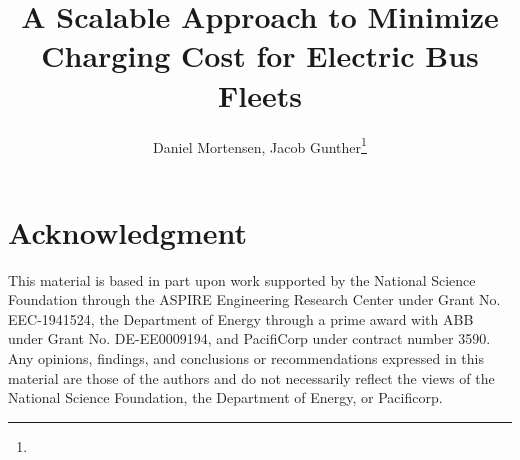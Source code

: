 \documentclass[lettersize,journal]{IEEEtran}
\begin{document}
\title{A Scalable Approach to Minimize Charging Cost for Electric Bus Fleets}
\author{Daniel Mortensen, Jacob Gunther\thanks{}}

%
{}

\maketitle 












\section*{Acknowledgment}This material is based in part upon work supported by the National Science Foundation through the ASPIRE Engineering Research Center under Grant No. EEC-1941524, the Department of Energy through a prime award with ABB under Grant No. DE-EE0009194, and PacifiCorp under contract number 3590. Any opinions, findings, and conclusions or recommendations expressed in this material are those of the authors and do not necessarily reflect the views of the National Science Foundation, the Department of Energy, or Pacificorp.

\printbibliography
\end{document}
